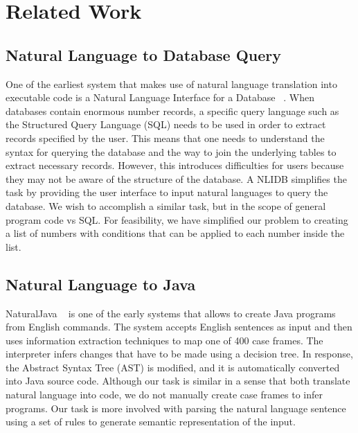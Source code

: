 \documentclass[11pt,letterpaper]{article}
\begin{document}
\section{Related Work}

\subsection{Natural Language to Database Query}

One of the earliest system that makes use of natural language translation into executable code is a Natural Language Interface for a Database ~\cite{Androutsopoulos1995NaturalLI}. 
When databases contain enormous number records, a specific query language such as the Structured Query Language (SQL) needs to be used in order to extract records specified by the user. 
This means that one needs to understand the syntax for querying the database and the way to join the underlying tables to extract necessary records. 
However, this introduces difficulties for users because they may not be aware of the structure of the database. 
A NLIDB simplifies the task by providing the user interface to input natural languages to query the database.
We wish to accomplish a similar task, but in the scope of general program code vs SQL.
For feasibility, we have simplified our problem to creating a list of numbers with conditions that can be applied to each number inside the list.   

\subsection{Natural Language to Java}
NaturalJava ~\cite{Price2000NaturalJavaAN} is one of the early systems that 
allows to create Java programs from English commands. 
The system accepts English sentences as input and then uses information extraction techniques to map one of 400 case frames. 
The interpreter infers changes that have to be made using a decision tree. In response, the Abstract Syntax Tree (AST) is modified, and it is automatically converted into Java source code. 
Although our task is similar in a sense that both translate natural language into code, we do not manually create case frames to infer programs. 
Our task is more involved with parsing the natural language sentence using a set of rules to generate semantic representation of the input.
\end{document}
